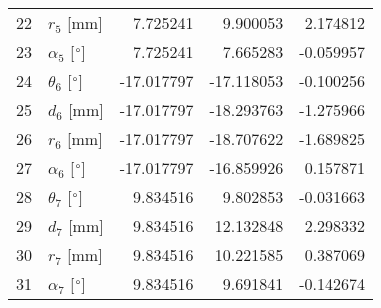\documentclass{standalone}%
\begin{document}
\begin{tabular}{llrrr}
22 &              $r_{5}$ [mm] &   7.725241 &   9.900053 &   2.174812 \\
23 &  $\alpha_{5}$ [$\degree$] &   7.725241 &   7.665283 &  -0.059957 \\
24 &  $\theta_{6}$ [$\degree$] & -17.017797 & -17.118053 &  -0.100256 \\
25 &              $d_{6}$ [mm] & -17.017797 & -18.293763 &  -1.275966 \\
26 &              $r_{6}$ [mm] & -17.017797 & -18.707622 &  -1.689825 \\
27 &  $\alpha_{6}$ [$\degree$] & -17.017797 & -16.859926 &   0.157871 \\
28 &  $\theta_{7}$ [$\degree$] &   9.834516 &   9.802853 &  -0.031663 \\
29 &              $d_{7}$ [mm] &   9.834516 &  12.132848 &   2.298332 \\
30 &              $r_{7}$ [mm] &   9.834516 &  10.221585 &   0.387069 \\
31 &  $\alpha_{7}$ [$\degree$] &   9.834516 &   9.691841 &  -0.142674 \\
\bottomrule
\end{tabular}
%
\end{document}
